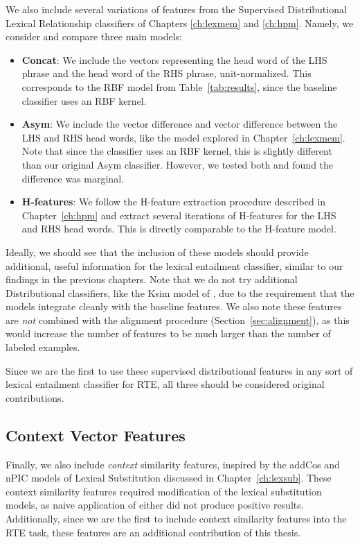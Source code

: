 We also include several variations of features from the Supervised
Distributional Lexical Relationship classifiers of Chapters \ref{ch:lexmem} and
\ref{ch:hpm}. Namely, we consider and compare three main models:
\begin{itemize}
  \item {\bf Concat}: We include the vectors representing the head word of the
    LHS phrase and the head word of the RHS phrase, unit-normalized. This
    corresponds to the RBF model from Table~\ref{tab:results}, since the
    baseline classifier uses an RBF kernel.
  \item {\bf Asym}: We include the vector difference and vector difference
    between the LHS and RHS head words, like the model explored in
    Chapter~\ref{ch:lexmem}. Note that since the classifier uses an RBF kernel,
    this is slightly different than our original Asym classifier. However,
    we tested both and found the difference was marginal.
  \item {\bf H-features}: We follow the H-feature extraction procedure described
    in Chapter~\ref{ch:hpm} and extract several iterations of H-features
    for the LHS and RHS head words. This is directly comparable to the
    H-feature model.
\end{itemize}
Ideally, we should see that the inclusion of these models should provide
additional, useful information for the lexical entailment classifier, similar
to our findings in the previous chapters. Note that we do not try additional
Distributional classifiers, like the Ksim model of ,
due to the requirement that the models integrate cleanly with the baseline
features. We also note these features are {\em not} combined with the
alignment procedure (Section~\ref{sec:alignment}), as this would increase
the number of features to be much larger than the number of labeled examples.

Since we are the first to use these supervised distributional features in any
sort of lexical entailment classifier for RTE, all three should be considered
original contributions.

\subsection{Context Vector Features}

Finally, we also include {\em context} similarity features, inspired by the
addCos \cite{melamud:2015:vsm} and nPIC \cite{roller:2016:naacl} models of
Lexical Substitution discussed in Chapter~\ref{ch:lexsub}. These context
similarity features required modification of the lexical substitution models,
as naive application of either did not produce positive results. Additionally,
since we are the first to include context similarity features into the RTE
task, these features are an additional contribution of this thesis.


